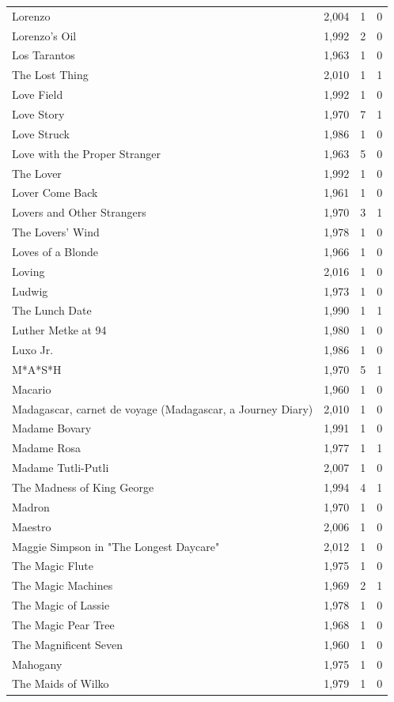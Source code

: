 \begin{tabular}{lrrr}
Lorenzo & 2,004 & 1 & 0 \\
Lorenzo's Oil & 1,992 & 2 & 0 \\
Los Tarantos & 1,963 & 1 & 0 \\
The Lost Thing & 2,010 & 1 & 1 \\
Love Field & 1,992 & 1 & 0 \\
Love Story & 1,970 & 7 & 1 \\
Love Struck & 1,986 & 1 & 0 \\
Love with the Proper Stranger & 1,963 & 5 & 0 \\
The Lover & 1,992 & 1 & 0 \\
Lover Come Back & 1,961 & 1 & 0 \\
Lovers and Other Strangers & 1,970 & 3 & 1 \\
The Lovers' Wind & 1,978 & 1 & 0 \\
Loves of a Blonde & 1,966 & 1 & 0 \\
Loving & 2,016 & 1 & 0 \\
Ludwig & 1,973 & 1 & 0 \\
The Lunch Date & 1,990 & 1 & 1 \\
Luther Metke at 94 & 1,980 & 1 & 0 \\
Luxo Jr. & 1,986 & 1 & 0 \\
M*A*S*H & 1,970 & 5 & 1 \\
Macario & 1,960 & 1 & 0 \\
Madagascar, carnet de voyage (Madagascar, a Journey Diary) & 2,010 & 1 & 0 \\
Madame Bovary & 1,991 & 1 & 0 \\
Madame Rosa & 1,977 & 1 & 1 \\
Madame Tutli-Putli & 2,007 & 1 & 0 \\
The Madness of King George & 1,994 & 4 & 1 \\
Madron & 1,970 & 1 & 0 \\
Maestro & 2,006 & 1 & 0 \\
Maggie Simpson in "The Longest Daycare" & 2,012 & 1 & 0 \\
The Magic Flute & 1,975 & 1 & 0 \\
The Magic Machines & 1,969 & 2 & 1 \\
The Magic of Lassie & 1,978 & 1 & 0 \\
The Magic Pear Tree & 1,968 & 1 & 0 \\
The Magnificent Seven & 1,960 & 1 & 0 \\
Mahogany & 1,975 & 1 & 0 \\
The Maids of Wilko & 1,979 & 1 & 0 \\

\end{tabular}
